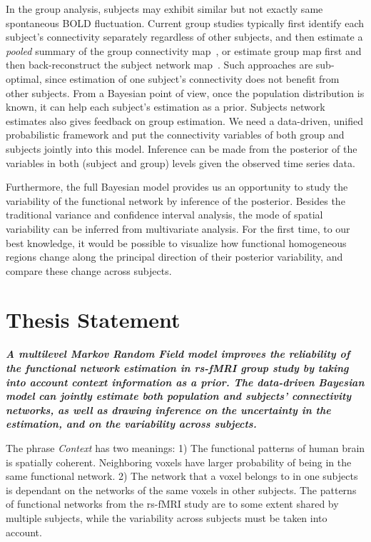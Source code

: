 \documentclass[12pt]{article}
\begin{document}
In the group analysis, subjects may exhibit similar but not exactly same
spontaneous BOLD fluctuation. Current group studies typically first identify
each subject's connectivity separately regardless of other subjects, and then
estimate a \emph{pooled} summary of the group connectivity
map~\cite{van2008normalized,craddock2011whole}, or estimate group map first and
then back-reconstruct the subject network map~\cite{calhoun2001method}.  Such
approaches are sub-optimal, since estimation of one subject's connectivity does
not benefit from other subjects. From a Bayesian  point of view, once
the population distribution is known, it can help each subject's estimation as a
prior. Subjects network estimates also gives feedback on group estimation.  We
need a data-driven, unified probabilistic framework and put the connectivity
variables of both group and subjects jointly into this model. Inference can be
made from the posterior of the variables in both (subject and group) levels
given the observed time series data.

Furthermore, the full Bayesian model provides us an opportunity to study the
variability of the functional network by inference of the posterior. Besides the
traditional variance and confidence interval analysis, the mode of spatial
variability can be inferred from multivariate analysis. For the first time, to
our best knowledge, it would be possible to visualize how functional homogeneous
regions change along the principal direction of their posterior variability, and
compare these change across subjects.

\section{Thesis Statement}

\begin{center}
\parbox{5in}{\emph{\textbf{A multilevel Markov Random Field model improves the
      reliability of the functional network estimation in rs-fMRI group study by
      taking into account context information as a prior. The data-driven
      Bayesian model can jointly estimate both population and subjects'
      connectivity networks, as well as drawing inference on the uncertainty in
      the estimation, and on the variability across subjects. }}}
\end{center}

\noindent The phrase \emph{Context} has two meanings: 1) The functional patterns
of human brain is spatially coherent. Neighboring voxels have larger probability
of being in the same functional network. 2) The network that a voxel belongs to
in one subjects is dependant on the networks of the same voxels in other
subjects. The patterns of functional networks from the rs-fMRI study are to some
extent shared by multiple subjects, while the variability across subjects must
be taken into account.
\end{document}
